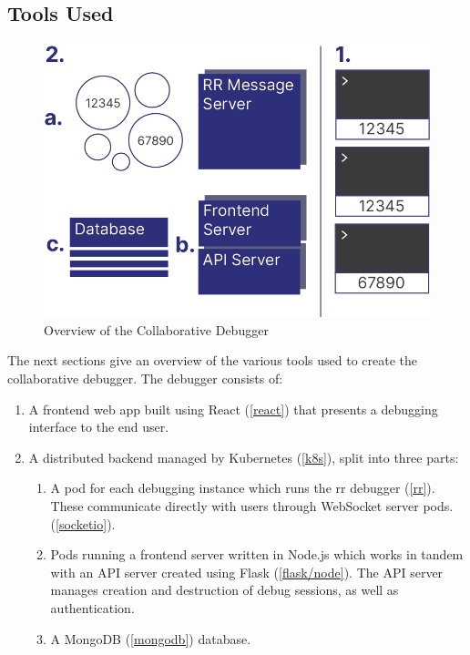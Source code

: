 \documentclass[12pt]{article}
\begin{document}
\subsection{Tools Used}

\begin{figure}[h!]

  \includegraphics[scale=.8]{overall_system}
  \centering
  \caption{Overview of the Collaborative Debugger}
  \label{debugger:overview}
\end{figure}

The next sections give an overview of the various tools used to create
the collaborative debugger.  The debugger consists of:

\begin{enumerate}
\item A frontend web app built using React (\ref{react}) that presents a debugging
  interface to the end user.
\item A distributed backend managed by Kubernetes (\ref{k8s}), split into three parts:
  \begin{enumerate}
  \item A pod for each debugging instance which runs the rr debugger
    (\ref{rr}).  These communicate directly with users through
    WebSocket server pods. (\ref{socketio}).
  \item Pods running a frontend server written in Node.js which works
    in tandem with an API server created using Flask
    (\ref{flask/node}).  The API server manages creation and
    destruction of debug sessions, as well as authentication.
  \item A MongoDB (\ref{mongodb}) database.
  \end{enumerate}
\end{enumerate}
\end{document}
